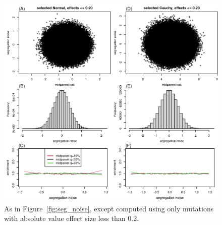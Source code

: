 \documentclass{article}
\newcommand{\1}{\mathbbm{1}}
\theoremstyle{remark}
\theoremstyle{definition}
\begin{document}
\begin{figure}
    \begin{center}
        \includegraphics{sims/selected_seg_noise_small}
    \end{center}
    \caption{
        As in Figure~\ref{fig:seg_noise},
        except computed using only mutations with absolute value effect size less than 0.2.
        \label{fig:sel_seg_noise_small}
    }
\end{figure}
\end{document}
